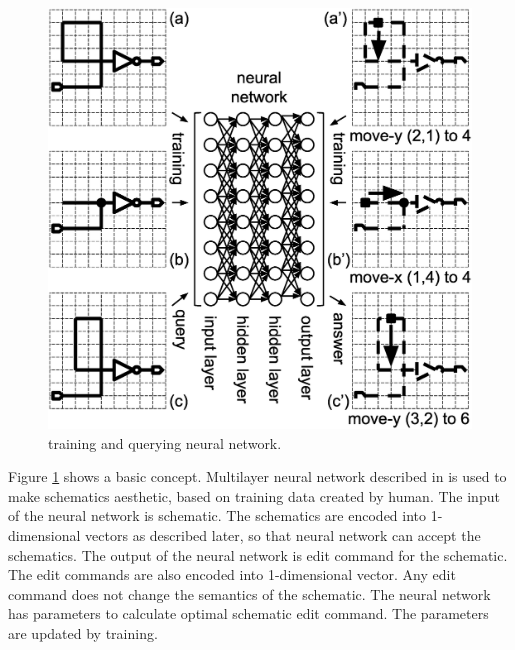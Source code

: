 \documentclass[twocolumn]{article}
\begin{document}
\begin{figure}[!tp]
 \begin{center}
  \begin{minipage}{\hsize}
   \includegraphics[width=\hsize]{fig/nn_schem_05.eps}
   \caption{training and querying neural network.}
   \label{fig:nn_schem}
  \end{minipage}
 \end{center}
\end{figure}


Figure \ref{fig:nn_schem} shows a basic concept.
Multilayer neural network described in \cite{mit} is used
to make schematics aesthetic, based on training data created by human.
The input of the neural network is schematic.
The schematics are encoded into 1-dimensional vectors as described later,
so that neural network can accept the schematics.
The output of the neural network is edit command for the schematic.
The edit commands are also encoded into 1-dimensional vector.
Any edit command does not change the semantics of the schematic.
The neural network has parameters to calculate optimal schematic edit command.
The parameters are updated by training.
\end{document}
